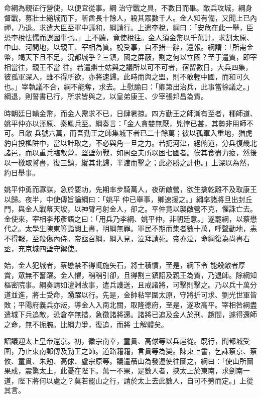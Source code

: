 \begin{pinyinscope}
 命綱為親征行營使，以便宜從事。綱
 治守戰之具，不數日而畢。敵兵攻城，綱身督戰，募壯士縋城而下，斬酋長十餘人，殺其眾數千人。金人知有備，又聞上已內禪，乃退。求遣大臣至軍中議和，綱請行。上遣李梲，綱曰：「安危在此一舉，臣恐李梲怯懦而誤國事也。」上不聽，竟使梲往。金人須金幣以千萬計，求割太原、中山、河間地，以親王、宰相為質。梲受事，自不措一辭，還報。綱謂：「所需金幣，竭天下且不足，況都城乎？三鎮，國之屏蔽，割之何以立國？至于遣質，即宰相當往，親王不當
 往。若遣辯士姑與之議所以可不可者，宿留數日，大兵四集，彼孤軍深入，雖不得所欲，亦將速歸。此時而與之盟，則不敢輕中國，而和可久也。」宰執議不合，綱不能奪，求去。上慰諭曰：「卿第出治兵，此事當徐議之。」綱退，則誓書已行，所求皆與之，以皇弟康王、少宰張邦昌為質。



 時朝廷日輸金幣，而金人需求不已，日肆暑掠。四方勤王之師漸有至者，種師道、姚平仲亦以涇原、秦鳳兵至。綱奏言：「金人貪婪無厭，兇悖已甚，其勢非用師不可。且敵
 兵號六萬，而吾勤王之師集城下者已二十餘萬；彼以孤軍入重地，猶虎豹自投檻阱中，當以計取之，不必與角一旦之力。若扼河津，絕餉道，分兵復畿北諸邑，而以重兵臨敵營，堅壁勿戰，如周亞夫所以困七國者。俟其食盡力疲，然後以一檄取誓書，復三鎮，縱其北歸，半渡而擊之；此必勝之計也。」上深以為然，約日舉事。



 姚平仲勇而寡謀，急於要功，先期率步騎萬人，夜斫敵營，欲生擒乾離不及取康王以歸。夜半，中使傳旨論綱曰：「姚平
 仲已舉事，卿速援之。」綱率諸將旦出封丘門，與金人戰幕天坡，以神臂弓射金人，卻之。平仲竟以襲敵營不克，懼誅亡去。金使來，宰相李邦彥語之曰：「用兵乃李綱、姚平仲，非朝廷意。」遂罷綱，以蔡懋代之。太學生陳東等詣闕上書，明綱無罪。軍民不期而集者數十萬，呼聲動地，恚不得報，至殺傷內侍。帝亟召綱，綱入見，泣拜請死。帝亦泣，命綱復為尚書右丞，充京城四壁守禦使。



 始，金人犯城者，蔡懋禁不得輒施矢石，將士積憤，至是，綱下令
 能殺敵者厚賞，眾無不奮躍。金人懼，稍稍引卻，且得割三鎮詔及親王為質，乃退師。除綱知樞密院事。綱奏請如澶淵故事，遣兵護送，且戒諸將，可擊則擊之。乃以兵十萬分道並進，將士受命，踴躍以行。先是，金帥粘罕圍太原，守將折可求、劉光世軍皆敗；平陽府義兵亦叛，導金人入南北關，取隆德府，至是，遂攻高平。宰相咎綱盡遣城下兵追敵，恐倉卒無措，急徵諸將還。諸將已追及金人於刑、趙間，遽得還師之命，無不扼腕。比綱力爭，復追，而將
 士解體矣。



 詔議迎太上皇帝還京。初，徽宗南幸，童貫、高俅等以兵扈從。既行，聞都城受圍，乃止東南郵傳及勤王之師。道路籍籍，言貫等為變。陳東上書，乞誅蔡京、蔡攸、童貫、朱勉、高俅、盧宗原等。議遣聶山為發運使往圖之，綱曰：「使山所圖果成，震驚太上，此憂在陛下。萬一不果，是數人者，挾太上於東南，求劍南一道，陛下將何以處之？莫若罷山之行，請於太上去此數人，自可不勞而定。」上從其言。




\end{pinyinscope}
